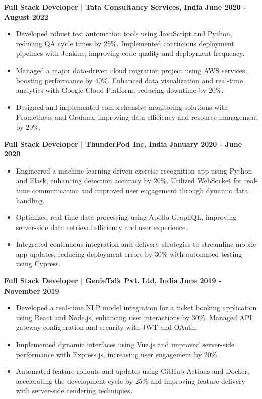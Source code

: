\documentclass{article}
\begin{document}
\noindent \textbf{Full Stack Developer $\mid$ Tata Consultancy Services, India}  \hfill \textbf{June 2020 - August 2022}
\begin{itemize}[noitemsep,nolistsep,leftmargin=*]
\item {\small Developed robust test automation tools using JavaScript and Python, reducing QA cycle times by 25\%. Implemented continuous deployment pipelines with Jenkins, improving code quality and deployment frequency.}
\item {\small Managed a major data-driven cloud migration project using AWS services, boosting performance by 40\%. Enhanced data visualization and real-time analytics with Google Cloud Platform, reducing downtime by 20\%.}
\item {\small Designed and implemented comprehensive monitoring solutions with Prometheus and Grafana, improving data efficiency and resource management by 20\%.}
\end{itemize}

\vspace{2mm} 

\noindent \textbf{Full Stack Developer $\mid$ ThunderPod Inc, India}  \hfill \textbf{January 2020 - June 2020}
\begin{itemize}[noitemsep,nolistsep,leftmargin=*]
\item {\small Engineered a machine learning-driven exercise recognition app using Python and Flask, enhancing detection accuracy by 20\%. Utilized WebSocket for real-time communication and improved user engagement through dynamic data handling.}
\item {\small Optimized real-time data processing using Apollo GraphQL, improving server-side data retrieval efficiency and user experience.}
\item {\small Integrated continuous integration and delivery strategies to streamline mobile app updates, reducing deployment errors by 30\% with automated testing using Cypress.}
\end{itemize}

\vspace{2mm} 

\noindent \textbf{Full Stack Developer $\mid$ GenieTalk Pvt. Ltd, India}  \hfill \textbf{June 2019 - November 2019}
\begin{itemize}[noitemsep,nolistsep,leftmargin=*]
\item {\small Developed a real-time NLP model integration for a ticket booking application using React and Node.js, enhancing user interactions by 30\%. Managed API gateway configuration and security with JWT and OAuth.}
\item {\small Implemented dynamic interfaces using Vue.js and improved server-side performance with Express.js, increasing user engagement by 20\%.}
\item {\small Automated feature rollouts and updates using GitHub Actions and Docker, accelerating the development cycle by 25\% and improving feature delivery with server-side rendering techniques.}
\end{itemize}
\end{document}
